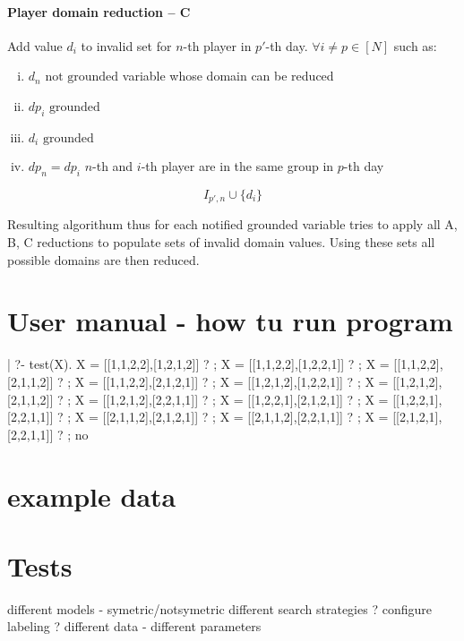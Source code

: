 \documentclass[a4paper]{article}
\theoremstyle{definition}
\theoremstyle{remark}
\begin{document}
\paragraph{Player domain reduction -- C}
Add value $d_i$ to invalid set for $n$-th player in  $p'$-th day.
$ \forall i \neq p \in [N]$ such as:
\begin{enumerate}[(i)]
\item $d_n \text{ not grounded}$ \hfill variable whose domain can be reduced 
\item $dp_i \text{ grounded}$ 
\item $d_i \text{ grounded}$ 
\item $dp_n = dp_i$ \hfill $n$-th and $i$-th player are in the same group in $p$-th day
\end{enumerate}
$$ I_{p',n} \cup \{ d_i \} $$

Resulting algorithum thus for each notified grounded variable tries to apply all A, B, C reductions
to populate sets of invalid domain values. Using these sets all possible domains are then
reduced.

\section{User manual - how tu run program }

| ?- test(X).                       
X = [[1,1,2,2],[1,2,1,2]] ? ;
X = [[1,1,2,2],[1,2,2,1]] ? ;
X = [[1,1,2,2],[2,1,1,2]] ? ;
X = [[1,1,2,2],[2,1,2,1]] ? ;
X = [[1,2,1,2],[1,2,2,1]] ? ;
X = [[1,2,1,2],[2,1,1,2]] ? ;
X = [[1,2,1,2],[2,2,1,1]] ? ;
X = [[1,2,2,1],[2,1,2,1]] ? ;
X = [[1,2,2,1],[2,2,1,1]] ? ;
X = [[2,1,1,2],[2,1,2,1]] ? ;
X = [[2,1,1,2],[2,2,1,1]] ? ;
X = [[2,1,2,1],[2,2,1,1]] ? ;
no


                                              

\section{example data}
\section{Tests}
different models - symetric/notsymetric
different search strategies ? configure labeling ? 
different data - different parameters
\end{document}

